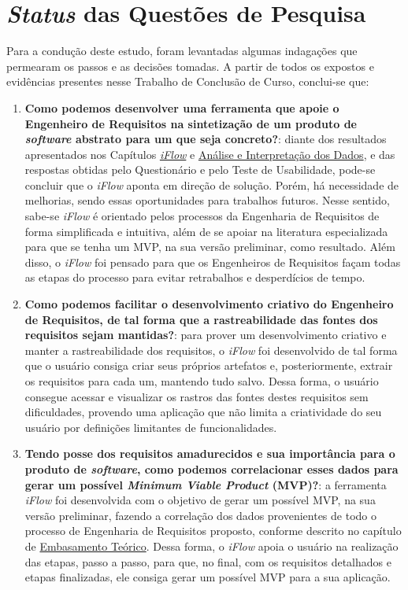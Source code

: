 \section{\textit{Status} das Questões de Pesquisa}

\label{sec:perguntas_respondidas}

Para a condução deste estudo, foram levantadas algumas indagações que permearam os passos e as decisões tomadas. A partir de todos os expostos e evidências presentes nesse Trabalho de Conclusão de Curso, conclui-se que:

\begin{enumerate}
    \item \textbf{Como podemos desenvolver uma ferramenta que apoie o Engenheiro de Requisitos na sintetização de um produto de \textit{software} abstrato para um que seja concreto?}: diante dos resultados apresentados nos Capítulos \hyperref[chap:proposta]{\textit{iFlow}} e \hyperref[sec:ana_int_dados]{Análise e Interpretação dos Dados}, e das respostas obtidas pelo Questionário e pelo Teste de Usabilidade, pode-se concluir que o \textit{iFlow} aponta em direção de solução. Porém, há necessidade de melhorias, sendo essas oportunidades para trabalhos futuros. Nesse sentido, sabe-se \textit{iFlow} é orientado pelos processos da Engenharia de Requisitos de forma simplificada e intuitiva, além de se apoiar na literatura especializada para que se tenha um MVP, na sua versão preliminar, como resultado. Além disso, o \textit{iFlow} foi pensado para que os Engenheiros de Requisitos façam todas as etapas do processo para evitar retrabalhos e desperdícios de tempo.
    \item \textbf{Como podemos facilitar o desenvolvimento criativo do Engenheiro de Requisitos, de tal forma que a rastreabilidade das fontes dos requisitos sejam mantidas?}: para prover um desenvolvimento criativo e manter a rastreabilidade dos requisitos, o \textit{iFlow} foi desenvolvido de tal forma que o usuário consiga criar seus próprios artefatos e, posteriormente, extrair os requisitos para cada um, mantendo tudo salvo. Dessa forma, o usuário consegue acessar e visualizar os rastros das fontes destes requisitos sem dificuldades, provendo uma aplicação que não limita a criatividade do seu usuário por definições limitantes de funcionalidades.
    \item \textbf{Tendo posse dos requisitos amadurecidos e sua importância para o produto de \textit{software}, como podemos correlacionar esses dados para gerar um possível \textit{Minimum Viable Product} (MVP)?}: a ferramenta \textit{iFlow} foi desenvolvida com o objetivo de gerar um possível MVP, na sua versão preliminar, fazendo a correlação dos dados provenientes de todo o processo de Engenharia de Requisitos proposto, conforme descrito no capítulo de \hyperref[chap:embasamento_teorico]{Embasamento Teórico}. Dessa forma, o \textit{iFlow} apoia o usuário na realização das etapas, passo a passo, para que, no final, com os requisitos detalhados e etapas finalizadas, ele consiga gerar um possível MVP para a sua aplicação.
\end{enumerate}

